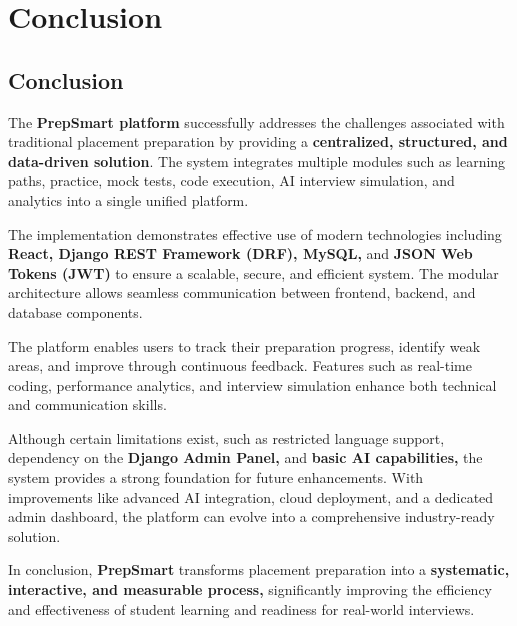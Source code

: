 \chapter{Conclusion}

\section{Conclusion}

The \textbf{PrepSmart platform} successfully addresses the challenges associated with traditional placement preparation by providing a \textbf{centralized, structured, and data-driven solution}. The system integrates multiple modules such as learning paths, practice, mock tests, code execution, AI interview simulation, and analytics into a single unified platform.

\vspace{0.2cm}

The implementation demonstrates effective use of modern technologies including \textbf{React, Django REST Framework (DRF), MySQL,} and \textbf{JSON Web Tokens (JWT)} to ensure a scalable, secure, and efficient system. The modular architecture allows seamless communication between frontend, backend, and database components.

\vspace{0.2cm}

The platform enables users to track their preparation progress, identify weak areas, and improve through continuous feedback. Features such as real-time coding, performance analytics, and interview simulation enhance both technical and communication skills.

\vspace{0.2cm}

Although certain limitations exist, such as restricted language support, dependency on the \textbf{Django Admin Panel,} and \textbf{basic AI capabilities,} the system provides a strong foundation for future enhancements. With improvements like advanced AI integration, cloud deployment, and a dedicated admin dashboard, the platform can evolve into a comprehensive industry-ready solution.

\vspace{0.2cm}

In conclusion, \textbf{PrepSmart} transforms placement preparation into a \textbf{systematic, interactive, and measurable process,} significantly improving the efficiency and effectiveness of student learning and readiness for real-world interviews.

\newpage